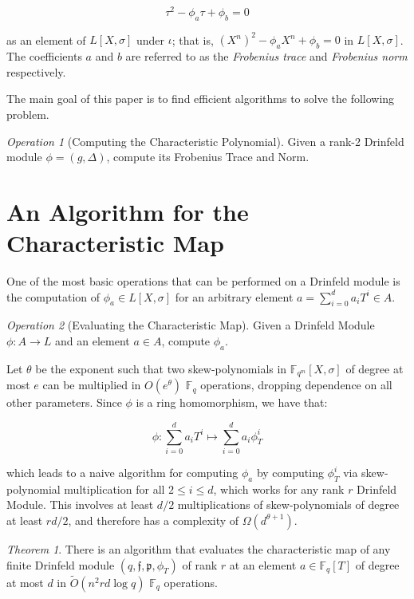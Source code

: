 \documentclass{jams-l}
\theoremstyle{remark}
\numberwithin{equation}{section}
\newtheorem{theorem}{Theorem}
\newtheorem{operation}{Operation}
\newcommand{\frakf}{\mathfrak{f}}
\begin{document}
\begin{equation} \tau^2 - \phi_a \tau + \phi_b = 0 \end{equation}

\noindent as an element of $L[X,\sigma]$ under $\iota$; that is, $(X^n)^2 - \phi_a X^n + \phi_b = 0$ in $L[X,\sigma]$. The coefficients $a$ and $b$ are referred to as the \textit{Frobenius trace} and \textit{Frobenius norm} respectively. 

The main goal of this paper is to find efficient algorithms to solve the following problem.

\begin{operation}[Computing the Characteristic Polynomial]
Given a rank-2 Drinfeld module $\phi = (g,\Delta)$, compute its Frobenius Trace and Norm.
\end{operation}

\section{An Algorithm for the Characteristic Map}

One of the most basic operations that can be performed on a Drinfeld module is the computation of $\phi_a \in L[X,\sigma]$ for an arbitrary element $a = \sum_{i=0}^d a_i T^i \in A$.

\begin{operation}[Evaluating the Characteristic Map]
Given a Drinfeld Module $\phi: A \to L$ and an element $a \in A$, compute $\phi_a$. 
\end{operation}

Let $\theta$ be the exponent such that two skew-polynomials in $\mathbb{F}_{q^m}[X,\sigma]$ of degree at most $e$ can be multiplied in $O(e^{\theta})$ $\mathbb{F}_q$ operations, dropping dependence on all other parameters. Since $\phi$ is a ring homomorphism, we have that:

\[ \phi : \sum_{i = 0}^d a_iT^i \mapsto \sum_{i = 0}^d a_i\phi_T^i \]

\noindent which leads to a naive algorithm for computing $\phi_a$ by computing $\phi_T^i$ via skew-polynomial multiplication for all $2 \leq i \leq d$, which works for any rank $r$ Drinfeld Module. This involves at least $d/2$ multiplications of skew-polynomials of degree at least $rd/2$, and therefore has a complexity of $\Omega(d^{\theta + 1})$. 

\begin{theorem}
There is an algorithm that evaluates the characteristic map of any finite Drinfeld module $(q,\frakf,\mathfrak{p}, \phi_T)$ of rank $r$ at an element $a \in \mathbb{F}_q[T]$ of degree at most $d$ in $\widetilde{O}(n^{2} rd \log q)$ $\mathbb{F}_q$ operations.
\end{theorem}
\end{document}
